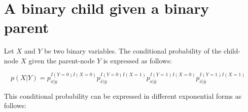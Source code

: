 \documentclass[11pt, oneside]{article}   	%
\numberwithin{figure}{section}
\numberwithin{equation}{section}
\numberwithin{table}{section}
\begin{document}
\section{A binary child given a binary parent}

Let $X$ and $Y$ be two binary variables. The conditional probability of the child-node $X$ given the parent-node $Y$ is expressed as follows:

$$ p(X|Y) = p_{x|y}^{I(Y=0)I(X=0)}p_{\bar{x}|y}^{I(Y=0)I(X=1)}p_{x|\bar{y}}^{I(Y=1)I(X=0)}p_{\bar{x}|\bar{y}}^{I(Y=1)I(X=1)}$$


This conditional probability can be expressed in different exponential forms as follows:
\end{document}

